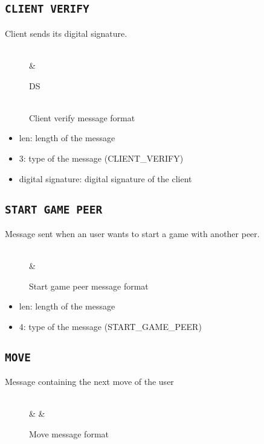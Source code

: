\subsection{\texttt{CLIENT VERIFY}}
Client sends its digital signature.
\begin{figure}[h]
	\centering
	\begin{bytefield}[bitwidth=1.1em]{32}
		 \\
		&  \\
		\begin{rightwordgroup}{DS}
			 \\
			 \\
		\end{rightwordgroup}
	\end{bytefield}
	\caption{Client verify message format}
\end{figure}

\begin{itemize}
	\item len: length of the message
	\item 3: type of the message (CLIENT\_VERIFY)
	\item digital signature: digital signature of the client
\end{itemize}

\subsection{\texttt{START GAME PEER}}
Message sent when an user wants to start a game with another peer.
\begin{figure}[h]
	\centering
	\begin{bytefield}[bitwidth=1.1em]{16}
		 \\
		& 
	\end{bytefield}
	\caption{Start game peer message format}
\end{figure}

\begin{itemize}
	\item len: length of the message
	\item 4: type of the message (START\_GAME\_PEER)
\end{itemize}

\subsection{\texttt{MOVE}}
Message containing the next move of the user
\begin{figure}[!htbp]
	\centering
	\begin{bytefield}[bitwidth=1.1em]{16}
		 \\
		& 
		& 
	\end{bytefield}
	\caption{Move message format}
\end{figure}

